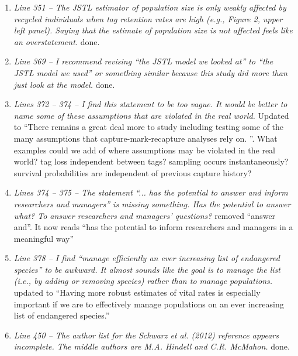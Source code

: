 \documentclass[12pt]{article}
\begin{document}
\begin{enumerate}
\begin{enumerate}
\item {\it Line 351 – The JSTL estimator of population size is only weakly affected by recycled individuals when tag retention rates are high (e.g., Figure 2, upper left panel). Saying that the estimate of population size is not affected feels like an overstatement.} 
done.

\item {\it Line 369 – I recommend revising “the JSTL model we looked at” to “the JSTL model we used” or something similar because this study did more than just look at the model.} 
done.

\item {\it Lines 372 – 374 – I find this statement to be too vague. It would be better to name some of these assumptions that are violated in the real world.}
Updated to ``There remains a great deal more to study including testing some of the many assumptions that capture-mark-recapture analyses rely on. ''.  What examples could we add of where assumptions may be violated in the real world? tag loss independent between tags? sampling occurs instantaneously? survival probabilities are independent of previous capture history? 

\item {\it Lines 374 – 375 – The statement “... has the potential to answer and inform researchers and managers” is missing something. Has the potential to answer what? To answer researchers and managers’ questions?}
removed ``answer and''. It now reads ``has the potential to inform researchers and managers in a meaningful way''

\item {\it Line 378 – I find “manage efficiently an ever increasing list of endangered species” to be awkward. It almost sounds like the goal is to manage the list (i.e., by adding or removing species) rather than to manage populations.}
updated to ``Having more robust estimates of vital rates is especially important if we are to effectively manage populations on an ever increasing list of endangered species.''

\item {\it Line 450 – The author list for the Schwarz et al. (2012) reference appears incomplete. The middle authors are M.A. Hindell and C.R. McMahon.}
done.
\end{enumerate}



\end{enumerate}
\end{document}
